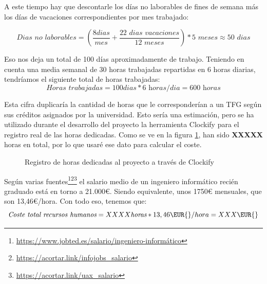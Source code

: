 A este tiempo hay que descontarle los días no laborables de fines de semana más los días de vacaciones correspondientes por mes trabajado:

\begin{equation*}
    \textit{Dias no laborables} = \left( \frac{8 \textit{dias}}{mes} + \frac{22 \textit{ dias vacaciones}}{12 \textit{ meses}}\right) * 5 \textit{ meses} \approx 50 \textit{ dias}
\end{equation*}

Eso nos deja un total de 100 días aproximadamente de trabajo. Teniendo en cuenta una media semanal de 30 horas trabajadas repartidas en 6 horas diarias, tendríamos el siguiente total de horas trabajadas:
\begin{equation*}
    \textit{Horas trabajadas} = 100 \textit{dias} * 6 \textit{ horas/dia} = 600 \textit{ horas}
\end{equation*}

Esta cifra duplicaría la cantidad de horas que le corresponderían a un TFG según sus créditos asignados por la universidad. Esto sería una estimación, pero se ha utilizado durante el desarrollo del proyecto la herramienta Clockify para el registro real de las horas dedicadas. Como se ve en la figura \ref{fig:clockify}, han sido \textbf{XXXXX} horas en total,
por lo que usaré ese dato para calcular el coste.

\begin{figure}[h!]
    \caption{Registro de horas dedicadas al proyecto a través de Clockify}
    \label{fig:clockify}
\end{figure}

Según varias fuentes\footnote{\url{https://www.jobted.es/salario/ingeniero-informático}}\footnotecomma\footnote{\url{https://acortar.link/infojobs_salario}}\footnotecomma\footnote{\url{https://acortar.link/uax_salario}} el salario medio de un ingeniero informático recién graduado está en torno a 21.000€. Siendo equivalente, unos 1750€ mensuales, que son 13,46€/hora. Con todo eso, tenemos que:
\begin{equation*}
    \textit{Coste total recursos humanos} = XXXX \textit{horas} * 13,46\EUR{}/hora = XXX \EUR{}
\end{equation*}


